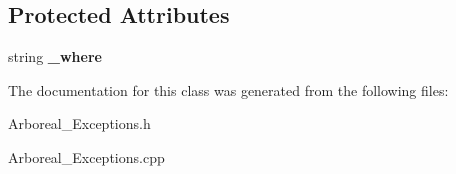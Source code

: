 \subsection*{Protected Attributes}
\begin{DoxyCompactItemize}
\item 
\mbox{\label{classarboreal__runtime__error_afca0adf6a259600843b6975591e0bde4}} 
string {\bfseries \+\_\+where}
\end{DoxyCompactItemize}


The documentation for this class was generated from the following files\+:\begin{DoxyCompactItemize}
\item 
Arboreal\+\_\+\+Exceptions.\+h\item 
Arboreal\+\_\+\+Exceptions.\+cpp\end{DoxyCompactItemize}
